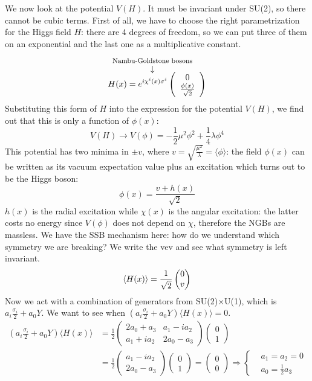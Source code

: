 \documentclass[../main.tex]{subfiles}
\begin{document}
We now look at the potential $V(H)$. It must be invariant under SU(2), so there cannot be cubic terms.  First of all, we have to choose the right parametrization for the Higgs field $H$: there are 4 degrees of freedom, so we can put three of them on an exponential and the last one as a multiplicative constant.
\[
H(x)=e^{i\overset{\mathclap{\tikz \node {$\downarrow$} node [above=1ex] {\footnotesize  Nambu-Goldstone bosons};}}{\chi^i(x)}\sigma^i}\left(\begin{array}{c}0\\\frac{\phi(x)}{\sqrt{2}}\end{array}\right)
\]
Substituting this form of $H$ into the expression for the potential $V(H)$, we find out that this is only a function of $\phi(x)$:
\[
V(H)\xrightarrow[]{}V(\phi)=-\frac{1}{2}\mu^2\phi^2+\frac{1}{4}\lambda\phi^4
\]
This potential has two minima in $\pm v$, where $v=\sqrt{\frac{\mu^2}{\lambda}}=\langle\phi\rangle$: the field $\phi(x)$ can be written as its vacuum expectation value plus an excitation which turns out to be the Higgs boson:
\[
\phi(x)=\frac{v+h(x)}{\sqrt{2}}
\]
$h(x)$ is the radial excitation while $\chi(x)$ is the angular excitation: the latter costs no energy since $V(\phi)$ does not depend on $\chi$, therefore the NGBs are massless. We have the SSB mechanism here: how do we understand which symmetry we are breaking? We write the vev and see what symmetry is left invariant.
\[
\Braket{H(x)}=\frac{1}{\sqrt{2}}\begin{pmatrix}
    0\\v
\end{pmatrix}
\]
Now we act with a combination of generators from SU(2)$\times$U(1), which is $a_i\frac{\sigma_i}{2}+a_0Y$. We want to see when $(a_i\frac{\sigma_i}{2}+a_0Y)\langle H(x)\rangle=0$.
\begin{align*}
\left(a_i\frac{\sigma_i}{2}+a_0Y\right)\langle H(x)\rangle&=\frac{1}{2}\left(\begin{array}{cc}
    2a_0+a_3 & a_1-ia_2 \\
    a_1+ia_2 & 2a_0-a_3
\end{array}\right)\begin{pmatrix}
    0\\1
\end{pmatrix}\\
&=\frac{1}{2}\begin{pmatrix}
    a_1-ia_2\\2a_0-a_3
\end{pmatrix}
\begin{pmatrix}
    0\\1
\end{pmatrix}=\begin{pmatrix}
    0\\0
\end{pmatrix}\Rightarrow\left\{\begin{aligned}
    &a_1=a_2=0\\
    &a_0=\frac{1}{2}a_3
\end{aligned}\right.
\end{align*}
\end{document}
